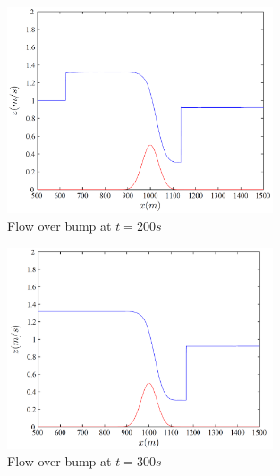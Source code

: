 \documentclass[handout]{beamer}
\begin{document}
\begin{frame}
	\begin{figure}
		\includegraphics[width=0.7\textwidth]{./Figures/SWWEt=200s.png}
		\caption{Flow over bump at $t= 200s$}
	\end{figure}
\end{frame}

\begin{frame}
	\begin{figure}
		\includegraphics[width=0.7\textwidth]{./Figures/SWWEt=300s.png}
		\caption{Flow over bump at $t= 300s$}
	\end{figure}
\end{frame}
\end{document}
